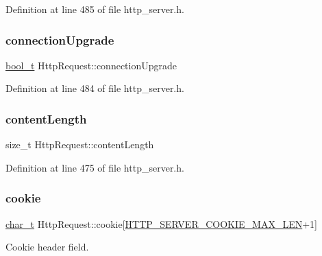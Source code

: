 Definition at line 485 of file http\+\_\+server.\+h.

\mbox{\label{structHttpRequest_a0d4325a4f6a122d19a92213c8b9f9ce4}} 
\subsubsection{\texorpdfstring{connection\+Upgrade}{connectionUpgrade}}
{\footnotesize\ttfamily \hyperlink{compiler__port_8h_a812d16e5494522586b3784e55d479912}{bool\+\_\+t} Http\+Request\+::connection\+Upgrade}



Definition at line 484 of file http\+\_\+server.\+h.

\mbox{\label{structHttpRequest_a0fb3be585ceb9a1a41a2398c86361061}} 
\subsubsection{\texorpdfstring{content\+Length}{contentLength}}
{\footnotesize\ttfamily size\+\_\+t Http\+Request\+::content\+Length}



Definition at line 475 of file http\+\_\+server.\+h.

\mbox{\label{structHttpRequest_a81615817f1f0d2b48595f6c33b33d541}} 
\subsubsection{\texorpdfstring{cookie}{cookie}}
{\footnotesize\ttfamily \hyperlink{compiler__port_8h_a40bb5262bf908c328fbcfbe5d29d0201}{char\+\_\+t} Http\+Request\+::cookie\mbox{[}\hyperlink{http__server_8h_ad5dfb8361753ec3dc34f805ed450fc4e}{H\+T\+T\+P\+\_\+\+S\+E\+R\+V\+E\+R\+\_\+\+C\+O\+O\+K\+I\+E\+\_\+\+M\+A\+X\+\_\+\+L\+EN}+1\mbox{]}}



Cookie header field. 



